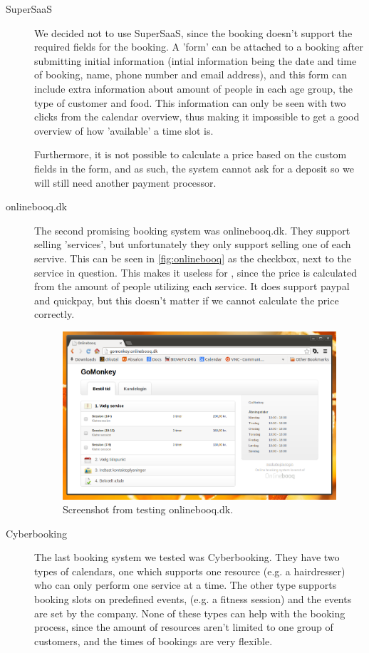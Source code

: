 \begin{description}
\item[SuperSaaS]
We decided not to use SuperSaaS, since the booking doesn’t support the required 
fields for the booking. A 'form' can be attached to a booking after submitting 
initial information (intial information being the date and time of booking, 
name, phone number and email address), and this 
form can include extra information about amount of people in each age group, the
type of customer and food. This information can only be seen with two clicks 
from the calendar overview, thus making it impossible to get a good overview of 
how 'available' a time slot is.

Furthermore, it is not possible to calculate a price based on the custom fields 
in the form, and as such, the system cannot ask for a deposit so we will still 
need another payment processor.

\item[onlinebooq.dk]
The second promising booking system was onlinebooq.dk. They support selling 
'services', but unfortunately they only support selling one of each servive.
This can be seen in \autoref{fig:onlinebooq} as the checkbox, next to the 
service in question. This makes it useless for \gomonkey{}, since the price is 
calculated from the amount of people utilizing each service. It does support 
paypal and quickpay, but this doesn't matter if we cannot calculate the price 
correctly.

\begin{figure}[htbp]
    \centering
        \includegraphics[width=.8\textwidth]{figures/onlinebooq.png}
	    \caption{Screenshot from testing onlinebooq.dk.}
        \label{fig:onlinebooq}
\end{figure}
		

\item[Cyberbooking]
The last booking system we tested was Cyberbooking. They have two types of 
calendars, one which supports one resource (e.g. a hairdresser) who can only
perform one service at a time. The other type supports booking slots on 
predefined events, (e.g. a fitness session) and the events are set by the 
company. None of these types can help \gomonkey{} with the booking process,
since the amount of resources aren't limited to one group of customers, and 
the times of bookings are very flexible.
\end{description}

